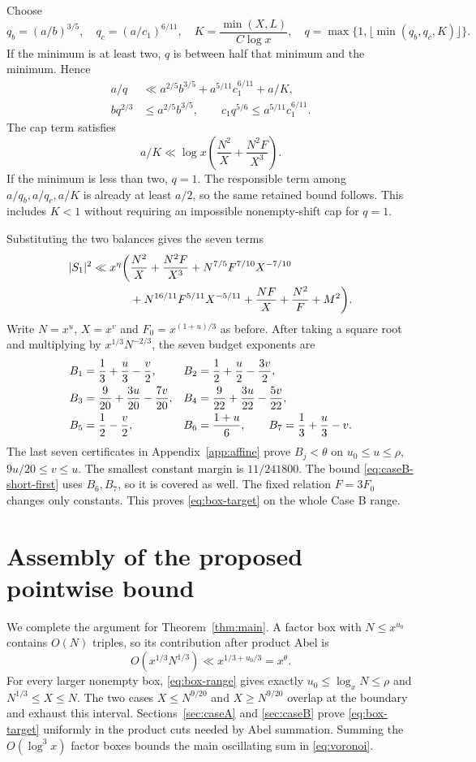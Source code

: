 \documentclass[11pt,a4paper]{article}
\numberwithin{equation}{section}
\theoremstyle{remark}
\newcommand{\Fzero}{F_0}
\begin{document}
Choose
\begin{equation}\label{eq:B-q}
 q_b=(a/b)^{3/5},\quad q_c=(a/c_1)^{6/11},\quad
 K=\frac{\min(X,L)}{C\log x},\quad
 q=\max\{1,\lfloor\min(q_b,q_c,K)\rfloor\}.
\end{equation}
If the minimum is at least two, $q$ is between half that minimum and the
minimum. Hence
\begin{align*}
 a/q&\ll a^{2/5}b^{3/5}+a^{5/11}c_1^{6/11}+a/K,\\
 bq^{2/3}&\le a^{2/5}b^{3/5},\qquad
 c_1q^{5/6}\le a^{5/11}c_1^{6/11}.
\end{align*}
The cap term satisfies
\[
 a/K\ll\log x\left(\frac{N^2}{X}+\frac{N^2F}{X^3}\right).
\]
If the minimum is less than two, $q=1$. The responsible term among
$a/q_b,a/q_c,a/K$ is already at least $a/2$, so the same retained bound
follows. This includes $K<1$ without requiring an impossible nonempty-shift
cap for $q=1$.

Substituting the two balances gives the seven terms
\begin{align}\label{eq:Bfinal}
 |S_1|^2\ll x^\eta\biggl(&\frac{N^2}{X}+\frac{N^2F}{X^3}
       +N^{7/5}F^{7/10}X^{-7/10}\notag\\
       &+N^{16/11}F^{5/11}X^{-5/11}
       +\frac{NF}{X}+\frac{N^2}{F}+M^2\biggr).
\end{align}
Write $N=x^u$, $X=x^v$ and $\Fzero=x^{(1+u)/3}$ as before. After taking
a square root and multiplying by $x^{1/3}N^{-2/3}$, the seven budget
exponents are
\begin{align}
 B_1&=\frac13+\frac u3-\frac v2,
 & B_2&=\frac12+\frac u2-\frac{3v}{2},\notag\\
 B_3&=\frac9{20}+\frac{3u}{20}-\frac{7v}{20},
 & B_4&=\frac9{22}+\frac{3u}{22}-\frac{5v}{22},
                 \label{eq:Bexponents}\\
 B_5&=\frac12-\frac v2,
 & B_6&=\frac{1+u}{6},\qquad
 B_7=\frac13+\frac u3-v.\notag
\end{align}
The last seven certificates in Appendix~\ref{app:affine} prove
$B_j<\theta$ on $u_0\le u\le\rho$, $9u/20\le v\le u$.
The smallest constant margin is $11/241800$. The bound
\eqref{eq:caseB-short-first} uses $B_6,B_7$, so it is covered as well.
The fixed relation $F=3\Fzero$ changes only constants. This proves
\eqref{eq:box-target} on the whole Case B range.

\section{Assembly of the proposed pointwise bound}
\label{sec:assembly}
We complete the argument for Theorem~\ref{thm:main}. A factor box with
$N\le x^{u_0}$ contains $O(N)$ triples, so its contribution after product
Abel is
\[
 O(x^{1/3}N^{1/3})\ll x^{1/3+u_0/3}=x^\theta.
\]
For every larger nonempty box, \eqref{eq:box-range} gives exactly
$u_0\le\log_xN\le\rho$ and $N^{1/3}\le X\le N$. The two cases
$X\le N^{9/20}$ and $X\ge N^{9/20}$ overlap at the boundary and exhaust
this interval. Sections~\ref{sec:caseA} and \ref{sec:caseB} prove
\eqref{eq:box-target} uniformly in the product cuts needed by Abel
summation. Summing the $O(\log^3x)$ factor boxes bounds the main oscillating
sum in \eqref{eq:voronoi}.
\end{document}
